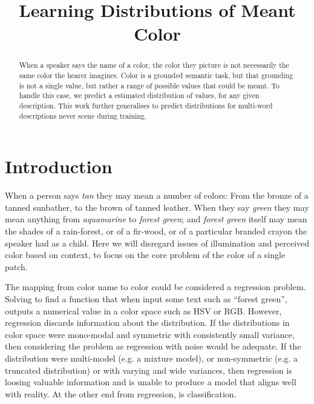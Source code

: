 \documentclass[]{article}
\title{Learning Distributions of Meant Color}
\author{}
\date{}
\begin{document}
\maketitle

\begin{abstract}
When a speaker says the name of a color, the color they picture is not necessarily the same color the hearer imagines.
Color is a grounded semantic task, but that grounding is not a single value, but rather a range of possible values that could be meant.
To handle this case, we predict a estimated distribution of values, for any given description.
This work further generalises to predict distributions for multi-word descriptions never scene during training.



\end{abstract}

\section{Introduction}
When a person says \emph{tan} they may mean a number of colors: From the bronze of a tanned sunbather, to the brown of tanned leather. When they say \emph{green} they may mean anything from \emph{aquamarine} to \emph{forest green}; and \emph{forest green} itself may mean the shades of a rain-forest, or of a fir-wood, or of a particular branded crayon the speaker had as a child.
Here we will disregard issues of illumination and perceived color based on context, to focus on the core problem of the color of a single patch.

The mapping from color name to color could be considered a regression problem. Solving to find a function that when input some text such as ``forest green'', outputs a numerical value in a color space such as HSV or RGB.
However, regression discards information about the distribution.
If the distributions in color space were mono-modal and symmetric with consistently small variance, then considering the problem as regression with noise would be adequate.
If the distribution were multi-model (e.g. a mixture model), or non-symmetric (e.g. a truncated distribution) or with varying and wide variances, then regression is loosing valuable information and is unable to produce a model that aligns well with reality.
At the other end from regression, is classification.
\end{document}
